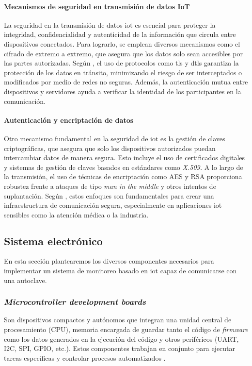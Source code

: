 \paragraph{Mecanismos de seguridad en transmisión de datos IoT}

La seguridad en la transmisión de datos \acrshort{iot} es esencial para proteger la integridad, confidencialidad y autenticidad de la información que circula entre dispositivos conectados. Para lograrlo, se emplean diversos mecanismos como el cifrado de extremo a extremo, que asegura que los datos solo sean accesibles por las partes autorizadas. Según \cite{Sicari2015}, el uso de protocolos como \acrfull{tls} y \acrfull{dtls} garantiza la protección de los datos en tránsito, minimizando el riesgo de ser interceptados o modificados por medio de redes no seguras. Además, la autenticación mutua entre dispositivos y servidores ayuda a verificar la identidad de los participantes en la comunicación.

\paragraph{Autenticación y encriptación de datos}
Otro mecanismo fundamental en la seguridad de \acrshort{iot} es la gestión de claves criptográficas, que asegura que solo los dispositivos autorizados puedan intercambiar datos de manera segura. Esto incluye el uso de certificados digitales y sistemas de gestión de claves basados en estándares como \textit{X.509.} A lo largo de la transmisión, el uso de técnicas de encriptación como AES y RSA proporciona robustez frente a ataques de tipo \textit{man in the middle} y otros intentos de suplantación. Según \cite{Zhou2018}, estos enfoques son fundamentales para crear una infraestructura de comunicación segura, especialmente en aplicaciones \acrshort{iot} sensibles como la atención médica o la industria.

\subsection{Sistema electrónico}
 En esta sección plantearemos los diversos componentes necesarios para implementar un sistema de monitoreo basado en \acrshort{iot} capaz de comunicarse con una autoclave.
 
\subsubsection{\textit{Microcontroller development boards}}
Son dispositivos compactos y autónomos que integran una unidad central de procesamiento (CPU), memoria encargada de guardar tanto el código de \textit{firmware} como los datos generados en la ejecución del código y otros periféricos (UART, I2C, SPI, GPIO, etc.). Estos componentes trabajan en conjunto para ejecutar tareas específicas y controlar procesos automatizados \citep{bolanakis2019survey}.

